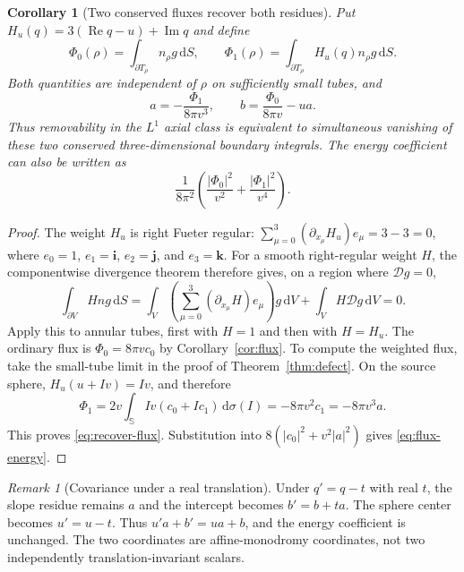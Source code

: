 \documentclass[11pt,a4paper]{article}
\numberwithin{equation}{section}
\newtheorem{corollary}[theorem]{Corollary}
\theoremstyle{definition}
\theoremstyle{remark}
\newtheorem{remark}[theorem]{Remark}
\newcommand{\SSS}{\mathbb S}
\newcommand{\ii}{\mathbf i}
\newcommand{\jj}{\mathbf j}
\newcommand{\kk}{\mathbf k}
\newcommand{\D}{\mathcal D}
\newcommand{\Rea}{\operatorname{Re}}
\newcommand{\Ima}{\operatorname{Im}}
\newcommand{\dd}{\,\mathrm d}
\begin{document}
\begin{corollary}[Two conserved fluxes recover both residues]
\label{cor:twoflux}
Put $H_u(q)=3(\Rea q-u)+\Ima q$ and define
\begin{equation}
 \Phi_0(\rho)=\int_{\partial T_\rho}n_\rho g\dd S,
 \qquad
 \Phi_1(\rho)=\int_{\partial T_\rho}H_u(q)n_\rho g\dd S.
 \label{eq:twoflux}
\end{equation}
Both quantities are independent of $\rho$ on sufficiently small tubes, and
\begin{equation}
 a=-\frac{\Phi_1}{8\pi v^3},\qquad
 b=\frac{\Phi_0}{8\pi v}-ua.
 \label{eq:recover-flux}
\end{equation}
Thus removability in the $L^1$ axial class is equivalent to simultaneous
vanishing of these two conserved three-dimensional boundary integrals.
The energy coefficient can also be written as
\begin{equation}
 \frac1{8\pi^2}
 \left(\frac{|\Phi_0|^2}{v^2}+\frac{|\Phi_1|^2}{v^4}\right).
 \label{eq:flux-energy}
\end{equation}
\end{corollary}
\begin{proof}
The weight $H_u$ is right Fueter regular:
$\sum_{\mu=0}^3(\partial_{x_\mu}H_u)e_\mu=3-3=0$,
where $e_0=1$, $e_1=\ii$, $e_2=\jj$, and $e_3=\kk$.
For a smooth right-regular weight $H$, the componentwise divergence theorem
therefore gives, on a region where $\D g=0$,
\[
 \int_{\partial V}Hn g\dd S
 =\int_V\left(\sum_{\mu=0}^3(\partial_{x_\mu}H)e_\mu\right)g\dd V
   +\int_VH\D g\dd V=0.
\]
Apply this to annular tubes, first with $H=1$ and then with $H=H_u$.
The ordinary flux is $\Phi_0=8\pi v c_0$ by
Corollary~\ref{cor:flux}. To compute the weighted flux, take the small-tube
limit in the proof of Theorem~\ref{thm:defect}. On the source sphere,
$H_u(u+Iv)=Iv$, and therefore
\[
 \Phi_1=2v\int_{\SSS}Iv(c_0+I c_1)\dd\sigma(I)
       =-8\pi v^2c_1=-8\pi v^3a.
\]
This proves \eqref{eq:recover-flux}. Substitution into
$8(|c_0|^2+v^2|a|^2)$ gives \eqref{eq:flux-energy}.
\end{proof}

\begin{remark}[Covariance under a real translation]
Under $q'=q-t$ with real $t$, the slope residue remains $a$ and the intercept
becomes $b'=b+ta$. The sphere center becomes $u'=u-t$. Thus
$u'a+b'=ua+b$, and the energy coefficient is unchanged. The two coordinates
are affine-monodromy coordinates, not two independently translation-invariant
scalars.
\end{remark}
\end{document}
